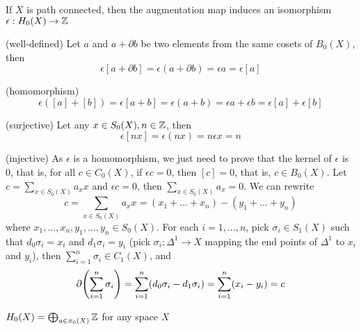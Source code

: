 \documentclass{report}
\begin{document}
\begin{center}
\end{center}

\begin{lemma}
    If $X$ is path connected, then the augmentation map induces an isomorphism $\epsilon: H_0(X) \to \mathbb{Z}$
\end{lemma}

\begin{longproof}

    (well-defined) Let $a$ and $a + \partial b$ be two elements from the same cosets of $B_0(X)$, then
    $$
        \epsilon [a + \partial b] = \epsilon (a + \partial b) = \epsilon a = \epsilon [a]
    $$

    (homomorphism)
    $$
        \epsilon ([a] + [b]) = \epsilon [a + b] = \epsilon (a + b) = \epsilon a + \epsilon b = \epsilon [a] + \epsilon [b]
    $$

    (surjective) Let any $x \in S_0(X), n \in \mathbb{Z}$, then 
    $$
        \epsilon [nx] = \epsilon (nx) = n \epsilon x = n
    $$

    (injective) As $\epsilon$ is a homomorphism, we just need to prove that the kernel of $\epsilon$ is $0$, that is, for all $c \in C_0(X)$, if $\epsilon c = 0$, then $[c] = 0$, that is, $c \in B_0(X)$. Let $c = \sum_{x \in S_0(X)} a_x x$ and $\epsilon c = 0$, then $\sum_{x \in S_0(X)} a_x = 0$. We can rewrite
    $$
        c = \sum_{x \in S_0(X)} a_x x = (x_1 + ... + x_n) - (y_1 + ... + y_n)
    $$
    where $x_1, ..., x_n, y_1, ..., y_n \in S_0(X)$. For each $i=1, ..., n$, pick $\sigma_i \in S_1(X)$ such that $d_0 \sigma_i = x_i$ and $d_1 \sigma_i = y_i$ (pick $\sigma_i: \Delta^1 \to X$ mapping the end points of $\Delta^1$ to $x_i$ and $y_i$), then $\sum_{i=1}^n \sigma_i \in C_1(X)$, and 
    $$
        \partial \tuple*{\sum_{i=1}^n \sigma_i} = \sum_{i=1}^n (d_0 \sigma_i - d_1 \sigma_i) = \sum_{i=1}^n (x_i - y_i) = c
    $$
\end{longproof}

\begin{corollary}
    $H_0(X) = \bigoplus_{a \in \pi_0(X)} \mathbb{Z}$ for any space $X$
\end{corollary}
\end{document}
